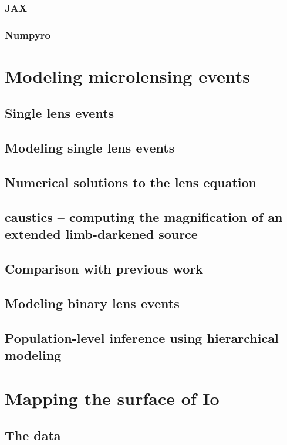 \documentclass[11pt]{report}
\begin{document}
\subsection{JAX}
\subsection{Numpyro}

\chapter{Modeling microlensing events}
\label{ch:microlensing}
\section{Single lens events}
\section{Modeling single lens events}
\section{Numerical solutions to the lens equation}
\section{\textsf{caustics} -- computing the magnification of an extended limb-darkened source}
\section{Comparison with previous work}
\section{Modeling binary lens events}
\section{Population-level inference using hierarchical modeling}

\chapter{Mapping the surface of Io}
\label{ch:mapping_io}
\section{The data}
\end{document}
